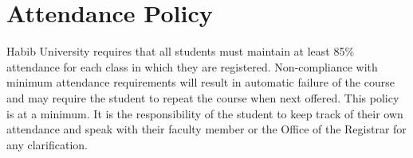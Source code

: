 \documentclass[a4paper]{article}
\begin{document}

\section{Attendance Policy}

Habib University requires that all 
students
must maintain at least 85\% attendance for 
each class in which they are registered. Non-compliance with minimum attendance 
requirements  will  result  in  automatic  failure  of  the  course  and  may  require  the 
student to
repeat the course when next offered. This policy is at a minimum. It is the 
responsibility  of  the  student  to  keep  track  of  their  own  attendance  and  speak  with 
their faculty member or the Office of the Registrar for any clarification. 

\end{document}
